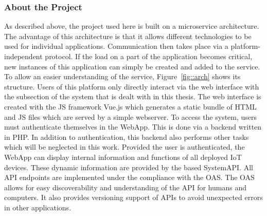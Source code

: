         \subsubsection{About the Project}\label{ssec::project}
        
        \noindent As described above, the project used here is built on a microservice architecture. The advantage of this architecture is that it allows different technologies to be used for individual applications. Communication then takes place via a platform-independent protocol. If the load on a part of the application becomes critical, new instances of this application can simply be created and added to the service.\newline
        To allow an easier understanding of the service, Figure~\ref{fig::arch} shows its structure. Users of this platform only directly interact via the web interface with the subsection of the system that is dealt with in this thesis.
        The web interface is created with the \ac{JS} framework Vue.js which generates a static bundle of HTML and \ac{JS} files which are served by a simple webserver. To access the system, users must authenticate themselves in the WebApp. This is done via a backend written in PHP. In addition to authentication, this backend also performs other tasks which will be neglected in this work. Provided the user is authenticated, the WebApp can display internal information and functions of all deployed \ac{IoT} devices. These dynamic information are provided by the  based SystemAPI. All \ac{API} endpoints are implemented under the compliance with the \ac{OAS}. The \ac{OAS} allows for easy discoverability and understanding of the \ac{API} for humans and computers. It also provides versioning support of \ac{API}s to avoid unexpected errors in other applications. \newline
